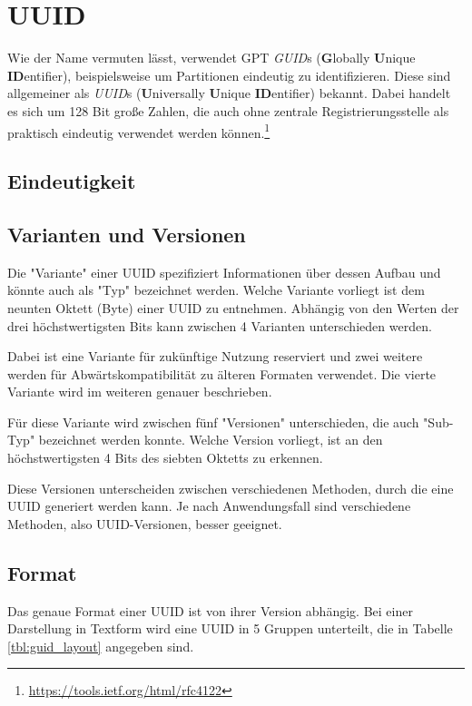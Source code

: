 \section{UUID}

Wie der Name vermuten lässt, verwendet GPT \textit{GUID}s (\textbf{G}lobally \textbf{U}nique \textbf{ID}entifier), beispielsweise um Partitionen eindeutig zu identifizieren.
Diese sind allgemeiner  als \textit{UUID}s (\textbf{U}niversally \textbf{U}nique \textbf{ID}entifier) bekannt. 
Dabei handelt es sich um 128 Bit große Zahlen, die auch ohne zentrale Registrierungsstelle als praktisch eindeutig verwendet werden können.\footnote{\url{https://tools.ietf.org/html/rfc4122}}

\subsection{Eindeutigkeit}

\subsection{Varianten und Versionen}
\label{sec:guid:variants}

Die "Variante" einer UUID spezifiziert Informationen über dessen Aufbau und könnte auch als "Typ" bezeichnet werden.
Welche Variante vorliegt ist dem neunten Oktett (Byte) einer UUID zu entnehmen.
Abhängig von den Werten der drei höchstwertigsten Bits kann zwischen 4 Varianten unterschieden werden.

Dabei ist eine Variante für zukünftige Nutzung reserviert und zwei weitere werden für Abwärtskompatibilität zu älteren Formaten verwendet. 
Die vierte Variante wird im weiteren genauer beschrieben.

Für diese Variante wird zwischen fünf "Versionen" unterschieden, die auch "Sub-Typ" bezeichnet werden konnte.
Welche Version vorliegt, ist an den höchstwertigsten 4 Bits des siebten Oktetts zu erkennen.

Diese Versionen unterscheiden zwischen verschiedenen Methoden, durch die eine UUID generiert werden kann.
Je nach Anwendungsfall sind verschiedene Methoden, also UUID-Versionen, besser geeignet.


\subsection{Format}
\label{sec:guid:format}

Das genaue Format einer UUID ist von ihrer Version abhängig.
Bei einer Darstellung in Textform wird eine UUID in 5 Gruppen unterteilt, die in Tabelle \ref{tbl:guid_layout} angegeben sind. 

